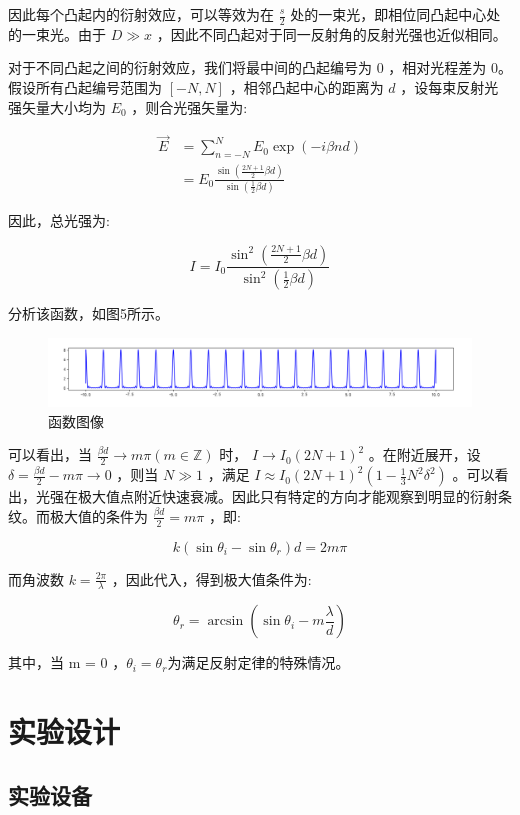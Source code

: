 \documentclass[fontset=windows]{article}
\begin{document}
因此每个凸起内的衍射效应，可以等效为在 $\frac{s}{2}$ 处的一束光，即相位同凸起中心处的一束光。由于 $D \gg x$ ，因此不同凸起对于同一反射角的反射光强也近似相同。

对于不同凸起之间的衍射效应，我们将最中间的凸起编号为 0 ，相对光程差为 0。假设所有凸起编号范围为 $[-N,N]$ ，相邻凸起中心的距离为 $d$ ，设每束反射光强矢量大小均为 $E_0$ ，则合光强矢量为:

$$
\begin{aligned}
    \vec{E} &= \sum_{n = -N}^{N} E_0 \exp(-i\beta n d) \\
            &= E_0 \frac{\sin(\frac{2N + 1}{2}\beta d)}{\sin(\frac{1}{2}\beta d)}
\end{aligned}
$$

因此，总光强为:

$$
I = I_0 \frac{\sin^2(\frac{2N + 1}{2}\beta d)}{\sin^2(\frac{1}{2}\beta d)}
$$

分析该函数，如图5所示。

\begin{figure}[htbp]
	\centering
	\includegraphics[scale=0.5]{4.png}
	\caption{ 函数图像}
	\label{5}
\end{figure}

可以看出，当 $\frac{\beta d}{2} \rightarrow m \pi (m\in\mathbb{Z})$ 时， $I\rightarrow I_0 (2N + 1)^2$ 。在附近展开，设 $\delta = \frac{\beta d}{2} - m \pi \rightarrow 0$ ，则当 $N \gg 1$ ，满足 $I \approx I_0 (2N + 1)^2 (1 -  \frac{1}{3}N^2 \delta^2)$ 。可以看出，光强在极大值点附近快速衰减。因此只有特定的方向才能观察到明显的衍射条纹。而极大值的条件为 $\frac{\beta d}{2}  = m \pi$ ，即:

$$
k(\sin\theta_i - \sin\theta_r) d = 2m \pi
$$

而角波数 $k = \frac{2\pi}{\lambda}$ ，因此代入，得到极大值条件为:

$$
\theta_r = \arcsin (\sin\theta_i - m\frac{\lambda}{d})
$$

其中，当 m = 0 ，$\theta_i = \theta_r$为满足反射定律的特殊情况。

\section{实验设计}

\subsection{实验设备}
\end{document}
